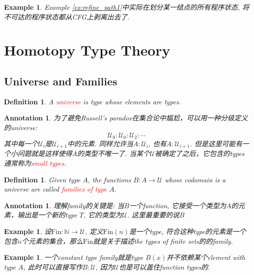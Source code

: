 \documentclass{article}
\newtheorem{example}[theorem]{Example}
\newtheorem{definition}[theorem]{Definition}
\newtheorem{annotation}[theorem]{Annotation}
\newcommand{\redt}[1]{\textcolor{red}{#1}}
\begin{document}
\begin{example}
\rm Example \ref{ex:refine_path1}中实际在划分某一结点的所有程序状态, 将不可达的程序状态都从CFG上剥离出去了.
\end{example}

\newpage
\section{Homotopy Type Theory}

\subsection{Universe and Families}

\begin{definition}
\rm A \redt{universe} is type whose elements are types.
\end{definition}

\begin{annotation}
\rm 为了避免Russell's paradox在集合论中尴尬，可以用一种分级定义的universe:
\[
	\mathcal{U}_0 : \mathcal{U}_0 :\mathcal{U}_2 : \cdots
\]
其中每一个$\mathcal{U}_i$是$\mathcal{U}_{i+1}$中的元素. 同样允许当$A:\mathcal{U}_i$, 也有$A : \mathcal{U}_{i+1}$. 但是这里可能有一个小问题就是这样使得$A$的类型不唯一了. 当某个$\mathcal{U}$被确定了之后，它包含的types通常称为\redt{small types}.
\end{annotation}

\begin{definition}
\rm Given type $A$, the functions $B: A \to \mathcal{U}$ whose codomain is a universe are called \redt{families of type} $A$.
\end{definition}

\begin{annotation}
\rm 理解family的关键是: 当$B$一个function, 它接受一个类型为$A$的元素，输出是一个新的type $T$, 它的类型为$\mathcal{U}$. 这里最重要的说$B$   
\end{annotation}

\begin{example}\label{ex:family_fin}
\rm 设$\text{Fin}:\mathbb{N} \to \mathcal{U}$, 定义$\text{Fin}(n)$是一个type, 符合这种type的元素是一个包含$n$个元素的集合，那么$\text{Fin}$就是关于描述the types of finite sets的的family.
\end{example}


\begin{example}
\rm 一个constant type family就是type $B(x)$并不依赖某个element with type $A$, 此时可以直接写作$B:\mathcal{U}$, 因为$\mathcal{U}$也是可以盖住function types的. 
\end{example}
\end{document}
